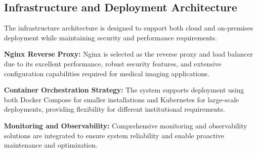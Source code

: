\subsection{Infrastructure and Deployment Architecture}

The infrastructure architecture is designed to support both cloud and on-premises deployment while maintaining security and performance requirements.

\textbf{Nginx Reverse Proxy:} Nginx is selected as the reverse proxy and load balancer due to its excellent performance, robust security features, and extensive configuration capabilities required for medical imaging applications.

\textbf{Container Orchestration Strategy:} The system supports deployment using both Docker Compose for smaller installations and Kubernetes for large-scale deployments, providing flexibility for different institutional requirements.

\textbf{Monitoring and Observability:} Comprehensive monitoring and observability solutions are integrated to ensure system reliability and enable proactive maintenance and optimization. 